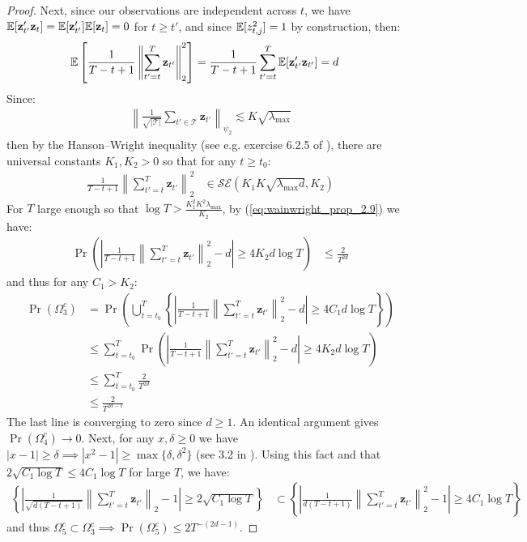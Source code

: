 \begin{proof}
Next, since our observations are independent across $t$, we have $\mathbb{E}[\mathbf{z}'_{t'}\mathbf{z}_{t}] = \mathbb{E}[\mathbf{z}'_{t'}]\mathbb{E}[\mathbf{z}_{t}] = 0$ for $t \geq t'$, and since $\mathbb{E}[z_{t,j}^2] = 1$ by construction, then:
\begin{align*}
    \mathbb{E}\left[ \frac{1}{T-t+1}\left\lVert\sum_{t'=t}^T\mathbf{z}_{t'}\right\rVert_2^2\right] &=  \frac{1}{T-t+1}\sum_{t'=t}^T\mathbb{E}[\mathbf{z}'_{t'}\mathbf{z}_{t'}] = d
\end{align*}
Since:
\begin{align*}
    \left\lVert\frac{1}{\sqrt{|\mathcal{T}|}}\sum_{t'\in\mathcal{T}}\mathbf{z}_{t'}\right\rVert_{\psi_2} \lesssim K\sqrt{\lambda_{\max}}
\end{align*}
then by the Hanson–Wright inequality (see e.g. exercise 6.2.5 of \citealp{Vershynin18}), there are universal constants $K_1,K_2>0$ so that for any $t \geq t_0$:
\begin{align*}
    \frac{1}{T-t+1}\left\lVert\sum_{t'=t}^T\mathbf{z}_{t'}\right\rVert_2^2 &\in \mathcal{SE}(K_1K\sqrt{\lambda_{\max}d},K_2) 
\end{align*}
For $T$ large enough so that $\log T > \frac{K_1^2K^2\lambda_{\max}}{K_2}$, by (\ref{eq:wainwright_prop_2.9}) we have: 
\begin{align*}
    \Pr\left(\left| \frac{1}{T-t+1}\left\lVert\sum_{t'=t}^T\mathbf{z}_{t'}\right\rVert_2^2 - d\right| \geq 4K_2d\log T\right) &\leq \frac{2}{T^{2d}}
\end{align*}
and thus for any $C_1 > K_2$:
\begin{align*}
    \Pr(\Omega^c_3) &= \Pr\left(\bigcup_{t= t_0}^T \left\{\left| \frac{1}{T-t+1}\left\lVert\sum_{t'=t}^T\mathbf{z}_{t'}\right\rVert_2^2 - d\right| \geq 4 C_1 d\log T \right\} \right) \\
    &\leq \sum_{t = t_0}^{T} \Pr\left(\left| \frac{1}{T-t+1}\left\lVert\sum_{t'=t}^T\mathbf{z}_{t'}\right\rVert_2^2 - d\right| \geq  4 K_2 d \log T \right) \tag{union bound and $C_1 > K_2$} \\
    &\leq \sum_{t = t_0}^{T} \frac{2}{T^{2d}} \\
    &\leq \frac{2}{T^{2d - 1}}
\end{align*}
The last line is converging to zero since $d \geq 1$. An identical argument gives $\Pr(\Omega^c_4) \to 0$. Next, for any $x,\delta \geq 0$ we have $|x - 1| \geq \delta \implies |x^2 - 1| \geq \max\{\delta, \delta^2\}$ (see 3.2 in \citealp{Vershynin18}). Using this fact and that $2\sqrt{C_1 \log T} \leq 4C_1 \log T$ for large $T$, we have:
\begin{align*}
    \left\{\left|\frac{1}{\sqrt{d(T-t+1)}}\left\lVert\sum_{t'=t}^T \mathbf{z}_{t'}\right\rVert_2 -1 \right| \geq  2\sqrt{ C_1 \log T}\right\} &\subset \left\{\left|\frac{1}{d(T-t+1)}\left\lVert\sum_{t'=t}^T \mathbf{z}_{t'}\right\rVert^2_2 -1 \right| \geq 4 C_1 \log T \right\} 
\end{align*}
and thus $\Omega_5^c \subset \Omega_3^c \implies \Pr(\Omega_5^c) \leq 2T^{-(2d-1)}$.

\end{proof}
